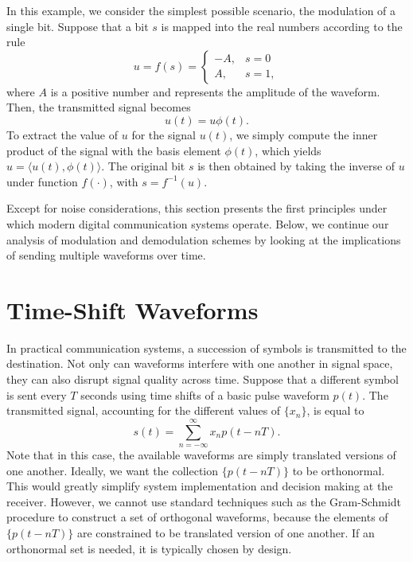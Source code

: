 \begin{example}
In this example, we consider the simplest possible scenario, the modulation of a single bit.
Suppose that a bit $s$ is mapped into the real numbers according to the rule
\begin{equation*}
u = f(s) = \begin{cases} -A, & s = 0 \\
A, & s = 1 , \end{cases}
\end{equation*}
where $A$ is a positive number and represents the amplitude of the waveform.
Then, the transmitted signal becomes
\begin{equation*}
u(t) = u \phi (t) .
\end{equation*}
To extract the value of $u$ for the signal $u(t)$, we simply compute the inner product of the signal with the basis element $\phi(t)$, which yields $u = \langle u(t), \phi(t) \rangle$.
The original bit $s$ is then obtained by taking the inverse of $u$ under function $f(\cdot)$, with $s = f^{-1} (u)$.
\end{example}

Except for noise considerations, this section presents the first principles under which modern digital communication systems operate.
Below, we continue our analysis of modulation and demodulation schemes by looking at the implications of sending multiple waveforms over time.
\fi

\section{Time-Shift Waveforms}

In practical communication systems, a succession of symbols is transmitted to the destination.
Not only can waveforms interfere with one another in signal space, they can also disrupt signal quality across time.
Suppose that a different symbol is sent every $T$ seconds using time shifts of a basic pulse waveform $p(t)$.
The transmitted signal, accounting for the different values of $\{ x_n \}$, is equal to
\begin{equation*}
s(t) = \sum_{n = -\infty}^{\infty} x_n p (t - nT) .
\end{equation*}
Note that in this case, the available waveforms are simply translated versions of one another.
Ideally, we want the collection $\{ p(t - nT) \}$ to be orthonormal.
This would greatly simplify system implementation and decision making at the receiver.
However, we cannot use standard techniques such as the Gram-Schmidt procedure to construct a set of orthogonal waveforms, because the elements of $\{ p(t - nT) \}$ are constrained to be translated version of one another.
If an orthonormal set is needed, it is typically chosen by design.

